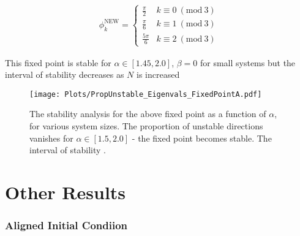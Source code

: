 \documentclass[9pt]{article}
\newcommand{\Mod}[1]{\ (\mathrm{mod}\ #1)}
\begin{document}
\begin{align}
  \phi_k^\text{NEW} = \begin{cases} 
      \frac{\pi}{2} & k \equiv 0 \Mod{3} \\
      \frac{\pi}{6} & k \equiv 1 \Mod{3} \\
      \frac{5\pi}{6} & k \equiv 2 \Mod{3}
   \end{cases}
\end{align}

This fixed point is stable for $\alpha \in [1.45, 2.0]$, $\beta = 0$ for small systems but the interval of stability decreases as $N$ is increased


\begin{figure}[h!]
  \centering
    \texttt{[image: Plots/PropUnstable\_Eigenvals\_FixedPointA.pdf]}
  \caption{The stability analysis for the above fixed point as a function of $\alpha$, for various system sizes. The proportion of unstable directions vanishes for $\alpha \in [1.5, 2.0]$ - the fixed point becomes stable. The interval of stability .}
  \label{fig:1_lin}
\end{figure}


\newpage



\newpage

\section{Other Results}


\subsubsection{Aligned Initial Condiion}
\end{document}
